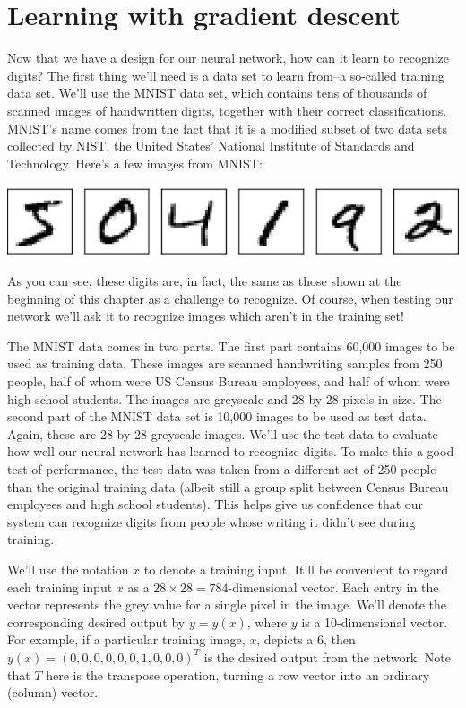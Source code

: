 \documentclass[a4paper,twoside,10pt]{book}
\begin{document}
\section{Learning with gradient descent}
\label{sec:1.5}
Now that we have a design for our neural network, how can it learn to recognize digits? The first thing we'll need is a data set to learn from--a so-called training data set. We'll use the \href{http://yann.lecun.com/exdb/mnist/}{MNIST data set}, which contains tens of thousands of scanned images of handwritten digits, together with their correct classifications. MNIST's name comes from the fact that it is a modified subset of two data sets collected by NIST, the United States' National Institute of Standards and Technology. Here's a few images from MNIST:
\begin{center}
	\includegraphics[scale=0.4]{./figures/ch1/digits_separate}
\end{center}
As you can see, these digits are, in fact, the same as those shown at the beginning of this chapter as a challenge to recognize. Of course, when testing our network we'll ask it to recognize images which aren't in the training set!

The MNIST data comes in two parts. The first part contains 60,000 images to be used as training data. These images are scanned handwriting samples from 250 people, half of whom were US Census Bureau employees, and half of whom were high school students. The images are greyscale and 28 by 28 pixels in size. The second part of the MNIST data set is 10,000 images to be used as test data. Again, these are 28 by 28 greyscale images. We'll use the test data to evaluate how well our neural network has learned to recognize digits. To make this a good test of performance, the test data was taken from a different set of 250 people than the original training data (albeit still a group split between Census Bureau employees and high school students). This helps give us confidence that our system can recognize digits from people whose writing it didn't see during training.

We'll use the notation $x$ to denote a training input. It'll be convenient to regard each training input $x$ as a $28\times28=784$-dimensional vector. Each entry in the vector represents the grey value for a single pixel in the image. We'll denote the corresponding desired output by $y=y(x)$, where $y$ is a 10-dimensional vector. For example, if a particular training image, $x$, depicts a 6, then $y(x)=(0,0,0,0,0,0,1,0,0,0)^T$ is the desired output from the network. Note that $T$ here is the transpose operation, turning a row vector into an ordinary (column) vector.
\end{document}
